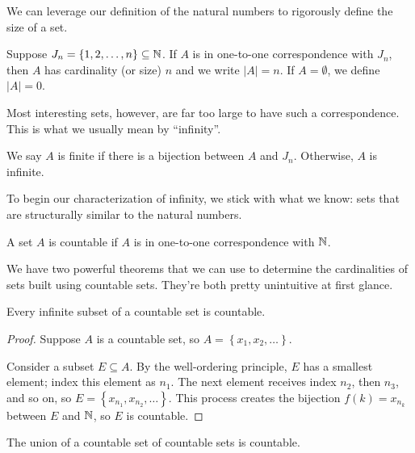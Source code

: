 \documentclass[../m131main.tex]{subfiles}
\begin{document}
We can leverage our definition of the natural numbers to rigorously define the size of a set.

\begin{definition}[Cardinality]
    Suppose $J_n = \left\{ 1, 2, \ldots, n \right\} \subseteq \mathbb{N}$.
    If $A$ is in one-to-one correspondence with $J_n$, then $A$ has cardinality (or size) $n$ and we write $|A| = n$.
    If $A = \emptyset$, we define $|A| = 0$.
\end{definition}

Most interesting sets, however, are far too large to have such a correspondence.
This is what we usually mean by ``infinity''.

\begin{definition}
    We say $A$ is finite if there is a bijection between $A$ and $J_n$.
    Otherwise, $A$ is infinite.
\end{definition}

To begin our characterization of infinity, we stick with what we know: sets that are structurally similar to the natural numbers.

\begin{definition}[Countable]
    A set $A$ is countable if $A$ is in one-to-one correspondence with $\mathbb{N}$.
\end{definition}

We have two powerful theorems that we can use to determine the cardinalities of sets built using countable sets.
They're both pretty unintuitive at first glance.

\begin{theorem}[]
    Every infinite subset of a countable set is countable.
\end{theorem}

\begin{proof}
    Suppose $A$ is a countable set, so $A = \left\{ x_1, x_2, \ldots \right\}$.

    Consider a subset $E \subseteq A$.
    By the well-ordering principle, $E$ has a smallest element; index this element as $n_1$.
    The next element receives index $n_2$, then $n_3$, and so on, so $E = \left\{ x_{n_1}, x_{n_2}, \ldots \right\}$.
    This process creates the bijection $f(k) = x_{n_k}$ between $E$ and $\mathbb{N}$, so $E$ is countable.
\end{proof}

\begin{theorem}
    The union of a countable set of countable sets is countable.
\end{theorem}
\end{document}
